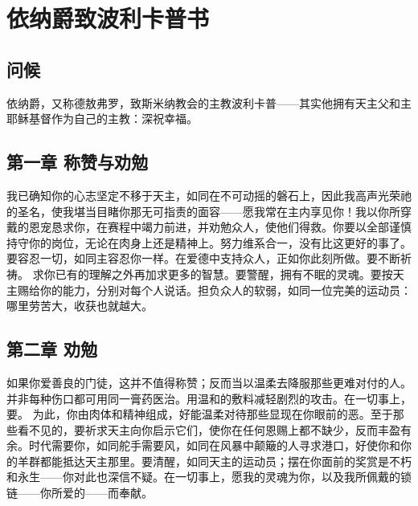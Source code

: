 
\chapter{依纳爵致波利卡普书}



\section{问候}

依纳爵，又称德敖弗罗，致斯米纳教会的主教波利卡普——其实他拥有天主父和主耶稣基督作为自己的主教：深祝幸福。\par


\section{第一章 称赞与劝勉}

我已确知你的心志坚定不移于天主，如同在不可动摇的磐石上，因此我高声光荣祂的圣名，使我堪当目睹你那无可指责的面容——愿我常在主内享见你！我以你所穿戴的恩宠恳求你，在赛程中竭力前进，并劝勉众人，使他们得救。你要以全部谨慎持守你的岗位，无论在肉身上还是精神上。努力维系合一，没有比这更好的事了。要容忍一切，如同主容忍你一样。在爱德中支持众人，正如你此刻所做。要不断祈祷。 求你已有的理解之外再加求更多的智慧。要警醒，拥有不眠的灵魂。要按天主赐给你的能力，分别对每个人说话。担负众人的软弱，如同一位完美的运动员：哪里劳苦大，收获也就越大。\par


\section{第二章 劝勉}

如果你爱善良的门徒，这并不值得称赞；反而当以温柔去降服那些更难对付的人。并非每种伤口都可用同一膏药医治。用温和的敷料减轻剧烈的攻击。在一切事上，要。 为此，你由肉体和精神组成，好能温柔对待那些显现在你眼前的恶。至于那些看不见的，要祈求天主向你启示它们，使你在任何恩赐上都不缺少，反而丰盈有余。时代需要你，如同舵手需要风，如同在风暴中颠簸的人寻求港口，好使你和你的羊群都能抵达天主那里。要清醒，如同天主的运动员；摆在你面前的奖赏是不朽和永生——你对此也深信不疑。在一切事上，愿我的灵魂为你，以及我所佩戴的锁链——你所爱的——而奉献。\par

